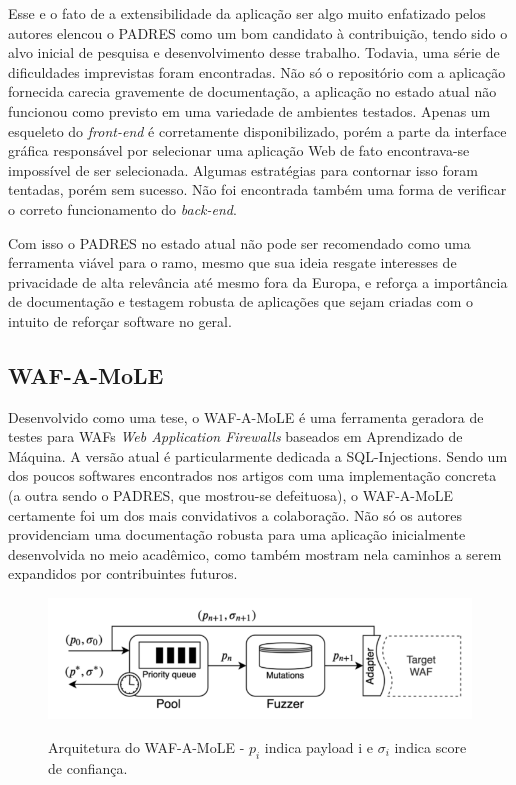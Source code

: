 Esse e o fato de a extensibilidade da aplicação ser algo muito enfatizado pelos autores elencou o PADRES como um bom candidato à contribuição, tendo sido o alvo inicial de pesquisa e desenvolvimento desse trabalho. Todavia, uma série de dificuldades imprevistas foram encontradas. Não só o repositório com a aplicação fornecida carecia gravemente de documentação, a aplicação no estado atual não funcionou como previsto em uma variedade de ambientes testados. Apenas um esqueleto do \textit{front-end} é corretamente disponibilizado, porém a parte da interface gráfica responsável por selecionar uma aplicação Web de fato encontrava-se impossível de ser selecionada. Algumas estratégias para contornar isso foram tentadas, porém sem sucesso. Não foi encontrada também uma forma de verificar o correto funcionamento do \textit{back-end}.

Com isso o PADRES no estado atual não pode ser recomendado como uma ferramenta viável para o ramo, mesmo que sua ideia resgate interesses de privacidade de alta relevância até mesmo fora da Europa, e reforça a importância de documentação e testagem robusta de aplicações que sejam criadas com o intuito de reforçar software no geral.

\subsection{WAF-A-MoLE}

Desenvolvido como uma tese, o WAF-A-MoLE é uma ferramenta geradora de testes para WAFs \textit{Web Application Firewalls} baseados em Aprendizado de Máquina. A versão atual é particularmente dedicada a SQL-Injections. Sendo um dos poucos softwares encontrados nos artigos com uma implementação concreta (a outra sendo o PADRES, que mostrou-se defeituosa), o WAF-A-MoLE certamente foi um dos mais convidativos a colaboração. Não só os autores providenciam uma documentação robusta para uma aplicação inicialmente desenvolvida no meio acadêmico, como também mostram nela caminhos a serem expandidos por contribuintes futuros.

\begin{figure}[ht]
    \centering
    \caption{Arquitetura do WAF-A-MoLE - $p_i$ indica payload i e $\sigma_i$  indica score de confiança.}
    \includegraphics[width=14cm]{figuras/wafamoleArchitecture.png} 
    \label{fig:internet} 
\end{figure}


